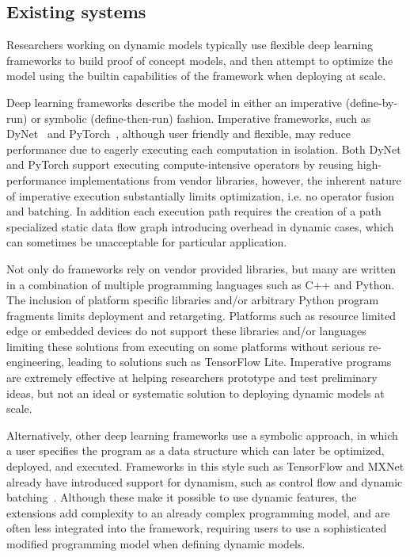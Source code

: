 \vspace{-1em}
\subsection{Existing systems}
\label{sec:background:existing}
Researchers working on dynamic models typically use flexible deep learning frameworks to build proof of concept models, and then attempt to optimize the model using the builtin capabilities of the framework when deploying at scale.

Deep learning frameworks describe the model in either an imperative (define-by-run) or symbolic (define-then-run) fashion.
Imperative frameworks, such as DyNet~\citep{dynet} and PyTorch~\citep{pytorch}, although user friendly and flexible, may reduce performance due to eagerly executing each computation in isolation.
Both DyNet and PyTorch support executing compute-intensive operators by reusing high-performance implementations from vendor libraries, however, the inherent nature of imperative execution substantially limits optimization, i.e. no operator fusion and batching.
In addition each execution path requires the creation of a path specialized static data flow graph introducing overhead in dynamic cases, which can sometimes be unacceptable for particular application.

Not only do frameworks rely on vendor provided libraries, but many are written in a combination of multiple programming languages such as C++ and Python. The inclusion of platform specific libraries and/or arbitrary Python program fragments limits deployment and retargeting.
Platforms such as resource limited edge or embedded devices do not support these libraries and/or languages limiting these solutions from executing on some platforms without serious re-engineering, leading to solutions such as TensorFlow Lite.
Imperative programs are extremely effective at helping researchers prototype and test preliminary ideas, but not an ideal or systematic solution to deploying dynamic models at scale.

Alternatively, other deep learning frameworks use a symbolic approach, in which a user specifies the program as a data structure which can later be optimized, deployed, and executed. Frameworks in this style such as TensorFlow and MXNet already have introduced support for dynamism, such as control flow and dynamic batching~\citep{yu2018dynamic, tf_fold, mxnet-control}. Although these make it possible to use dynamic features, the extensions add complexity to an already complex programming model, and are often less integrated into the framework, requiring users to use a sophisticated modified programming model when defining dynamic models.


